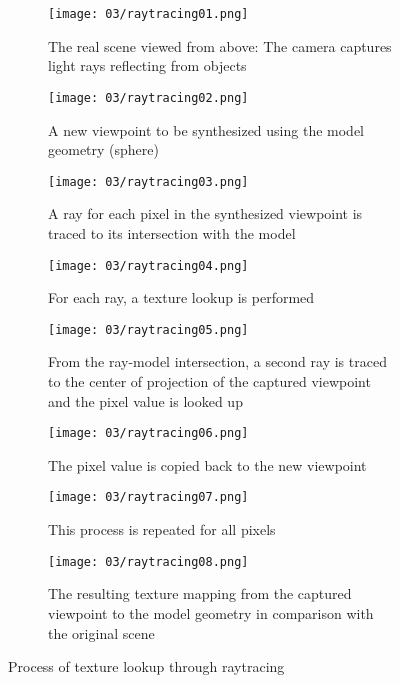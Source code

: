 \begin{figure}
\centering
    \hfill
    \begin{subfigure}[t]{0.3\textwidth}            
            \centering
            \texttt{[image: 03/raytracing01.png]}
            \caption{The real scene viewed from above: The camera captures light rays reflecting from objects}
    \end{subfigure}%
    \hfill
    \begin{subfigure}[t]{0.3\textwidth}
            \centering
            \texttt{[image: 03/raytracing02.png]}
            \caption{A new viewpoint to be synthesized using the model geometry (sphere)}
    \end{subfigure}
    \hfill
    \hfill

    \hfill
    \begin{subfigure}[t]{0.3\textwidth}            
            \centering
            \texttt{[image: 03/raytracing03.png]}
            \caption{A ray for each pixel in the synthesized viewpoint is traced to its intersection with the model}
    \end{subfigure}%
    \hfill
    \begin{subfigure}[t]{0.3\textwidth}
            \centering
            \texttt{[image: 03/raytracing04.png]}
            \caption{For each ray, a texture lookup is performed}
    \end{subfigure}
    \hfill
    \begin{subfigure}[t]{0.3\textwidth}
            \centering
            \texttt{[image: 03/raytracing05.png]}
            \caption{From the ray-model intersection, a second ray is traced to the center of projection of the captured viewpoint and the pixel value is looked up}
    \end{subfigure}
    \hfill

    \hfill
    \begin{subfigure}[t]{0.3\textwidth}            
            \centering
            \texttt{[image: 03/raytracing06.png]}
            \caption{The pixel value is copied back to the new viewpoint}
    \end{subfigure}%
    \hfill
    \begin{subfigure}[t]{0.3\textwidth}
            \centering
            \texttt{[image: 03/raytracing07.png]}
            \caption{This process is repeated for all pixels}
    \end{subfigure}
    \hfill
    \begin{subfigure}[t]{0.3\textwidth}
            \centering
            \texttt{[image: 03/raytracing08.png]}
            \caption{The resulting texture mapping from the captured viewpoint to the model geometry in comparison with the original scene}
    \end{subfigure}
    \hfill
    \caption[Texture lookup through raytracing]{Process of texture lookup through raytracing}\label{fig:raytracing}
\end{figure}

